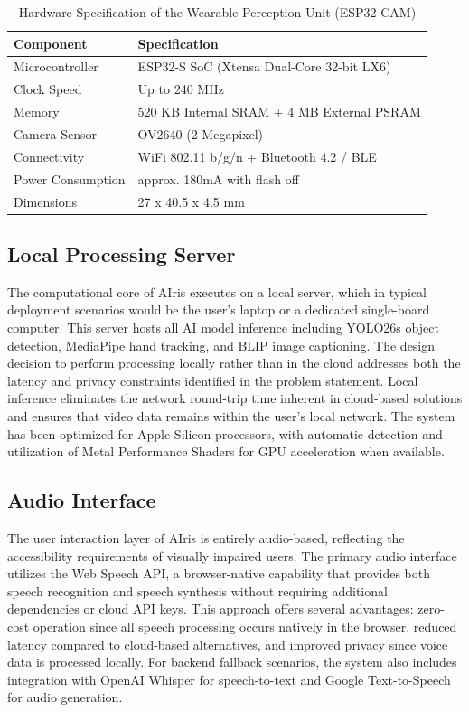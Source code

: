 \documentclass[12pt,a4paper]{report}
\begin{document}
\begin{table}[H]
\centering
\caption{Hardware Specification of the Wearable Perception Unit (ESP32-CAM)}
\label{tab:hardware_specs}
\begin{tabular}{@{}ll@{}}
\toprule
\textbf{Component} & \textbf{Specification} \\ \midrule
Microcontroller & ESP32-S SoC (Xtensa Dual-Core 32-bit LX6) \\
Clock Speed & Up to 240 MHz \\
Memory & 520 KB Internal SRAM + 4 MB External PSRAM \\
Camera Sensor & OV2640 (2 Megapixel) \\
Connectivity & WiFi 802.11 b/g/n + Bluetooth 4.2 / BLE \\
Power Consumption & approx. 180mA with flash off \\
Dimensions & 27 x 40.5 x 4.5 mm \\ \bottomrule
\end{tabular}
\end{table}

\subsection{Local Processing Server}

The computational core of AIris executes on a local server, which in typical deployment scenarios would be the user's laptop or a dedicated single-board computer. This server hosts all AI model inference including YOLO26s object detection, MediaPipe hand tracking, and BLIP image captioning. The design decision to perform processing locally rather than in the cloud addresses both the latency and privacy constraints identified in the problem statement. Local inference eliminates the network round-trip time inherent in cloud-based solutions and ensures that video data remains within the user's local network. The system has been optimized for Apple Silicon processors, with automatic detection and utilization of Metal Performance Shaders for GPU acceleration when available.

\subsection{Audio Interface}

The user interaction layer of AIris is entirely audio-based, reflecting the accessibility requirements of visually impaired users. The primary audio interface utilizes the Web Speech API, a browser-native capability that provides both speech recognition and speech synthesis without requiring additional dependencies or cloud API keys. This approach offers several advantages: zero-cost operation since all speech processing occurs natively in the browser, reduced latency compared to cloud-based alternatives, and improved privacy since voice data is processed locally. For backend fallback scenarios, the system also includes integration with OpenAI Whisper for speech-to-text and Google Text-to-Speech for audio generation.
\end{document}

